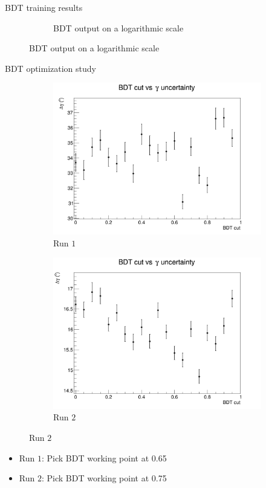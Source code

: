 \documentclass{beamer}
\begin{document}
\begin{frame}{BDT training results}
\begin{figure}
\begin{subfigure}{0.5\textwidth}
      \caption{BDT output on a logarithmic scale}
    \end{subfigure}
  \end{figure}
\end{frame}

\begin{frame}{BDT optimization study}
  \begin{figure}
    \centering
    \vspace{-0.2cm}
    \begin{subfigure}{0.5\textwidth}
      \includegraphics[width = 1.0\textwidth]{Plots/BDTCutVersusGammaErrorRun1.png}
      \caption{Run $1$}
    \end{subfigure}%
    \begin{subfigure}{0.5\textwidth}
      \includegraphics[width = 1.0\textwidth]{Plots/BDTCutVersusGammaErrorRun2.png}
      \caption{Run $2$}
    \end{subfigure}
  \end{figure}
  \begin{itemize}
    \item{Run $1$: Pick BDT working point at 0.65}
    \item{Run $2$: Pick BDT working point at 0.75}
  \end{itemize}
\end{frame}
\end{document}
